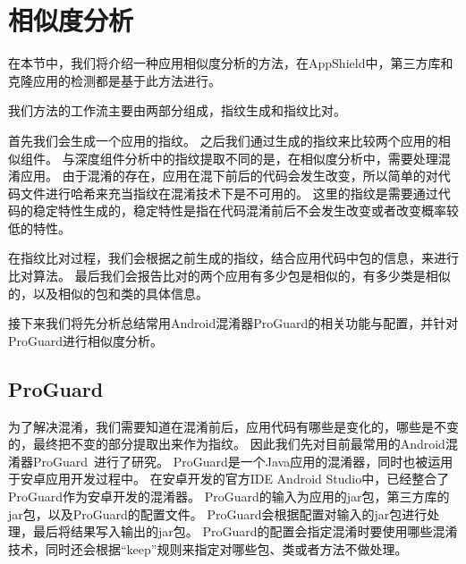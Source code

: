 \section{相似度分析}
\label{sec:appshield:sim-analysis}

在本节中，我们将介绍一种应用相似度分析的方法，在AppShield中，第三方库和克隆应用的检测都是基于此方法进行。

我们方法的工作流主要由两部分组成，指纹生成和指纹比对。

首先我们会生成一个应用的指纹。
之后我们通过生成的指纹来比较两个应用的相似组件。
与深度组件分析中的指纹提取不同的是，在相似度分析中，需要处理混淆应用。
由于混淆的存在，应用在混下前后的代码会发生改变，所以简单的对代码文件进行哈希来充当指纹在混淆技术下是不可用的。
这里的指纹是需要通过代码的稳定特性生成的，稳定特性是指在代码混淆前后不会发生改变或者改变概率较低的特性。

在指纹比对过程，我们会根据之前生成的指纹，结合应用代码中包的信息，来进行比对算法。
最后我们会报告比对的两个应用有多少包是相似的，有多少类是相似的，以及相似的包和类的具体信息。

接下来我们将先分析总结常用Android混淆器ProGuard的相关功能与配置，并针对ProGuard进行相似度分析。

\subsection{ProGuard}
\label{sec:appshield:proguard}

为了解决混淆，我们需要知道在混淆前后，应用代码有哪些是变化的，哪些是不变的，最终把不变的部分提取出来作为指纹。
因此我们先对目前最常用的Android混淆器ProGuard~\supercite{proguard}进行了研究。
ProGuard是一个Java应用的混淆器，同时也被运用于安卓应用开发过程中。
在安卓开发的官方IDE Android Studio中，已经整合了ProGuard作为安卓开发的混淆器。
ProGuard的输入为应用的jar包，第三方库的jar包，以及ProGuard的配置文件。
ProGuard会根据配置对输入的jar包进行处理，最后将结果写入输出的jar包。
ProGuard的配置会指定混淆时要使用哪些混淆技术，同时还会根据“keep”规则来指定对哪些包、类或者方法不做处理。

